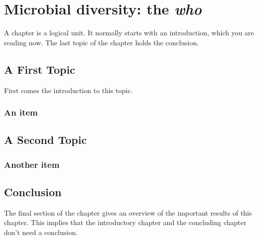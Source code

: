 
\chapter{Microbial diversity: the \textit{who}}
\label{cha:1}
A chapter is a logical unit. It normally starts with an introduction, which
you are reading now. The last topic of the chapter holds the conclusion.

\section{A First Topic}
First comes the introduction to this topic.


\subsection{An item}


\section{A Second Topic}

\subsection{Another item}

\section{Conclusion}
The final section of the chapter gives an overview of the important results
of this chapter. This implies that the introductory chapter and the
concluding chapter don't need a conclusion.

